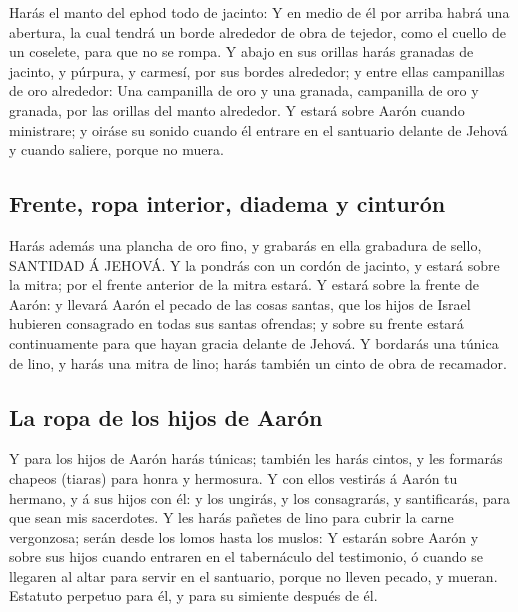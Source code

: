  Harás el manto del ephod todo de jacinto:  Y
en medio de él por arriba habrá una abertura, la cual tendrá un borde
alrededor de obra de tejedor, como el cuello de un coselete, para que no
se rompa.  Y abajo en sus orillas harás granadas de
jacinto, y púrpura, y carmesí, por sus bordes alrededor; y entre ellas
campanillas de oro alrededor:  Una campanilla de oro y una
granada, campanilla de oro y granada, por las orillas del manto
alrededor.  Y estará sobre Aarón cuando ministrare; y
oiráse su sonido cuando él entrare en el santuario delante de Jehová y
cuando saliere, porque no muera.

\hypertarget{frente-ropa-interior-diadema-y-cinturuxf3n}{%
\subsection{Frente, ropa interior, diadema y
cinturón}\label{frente-ropa-interior-diadema-y-cinturuxf3n}}

 Harás además una plancha de oro fino, y grabarás en ella
grabadura de sello, SANTIDAD Á JEHOVÁ.  Y la pondrás con un
cordón de jacinto, y estará sobre la mitra; por el frente anterior de la
mitra estará.  Y estará sobre la frente de Aarón: y llevará
Aarón el pecado de las cosas santas, que los hijos de Israel hubieren
consagrado en todas sus santas ofrendas; y sobre su frente estará
continuamente para que hayan gracia delante de Jehová.  Y
bordarás una túnica de lino, y harás una mitra de lino; harás también un
cinto de obra de recamador.

\hypertarget{la-ropa-de-los-hijos-de-aaruxf3n}{%
\subsection{La ropa de los hijos de
Aarón}\label{la-ropa-de-los-hijos-de-aaruxf3n}}

 Y para los hijos de Aarón harás túnicas; también les harás
cintos, y les formarás chapeos (tiaras) para honra y hermosura.
 Y con ellos vestirás á Aarón tu hermano, y á sus hijos con
él: y los ungirás, y los consagrarás, y santificarás, para que sean mis
sacerdotes.  Y les harás pañetes de lino para cubrir la
carne vergonzosa; serán desde los lomos hasta los muslos: 
Y estarán sobre Aarón y sobre sus hijos cuando entraren en el
tabernáculo del testimonio, ó cuando se llegaren al altar para servir en
el santuario, porque no lleven pecado, y mueran. Estatuto perpetuo para
él, y para su simiente después de él.

